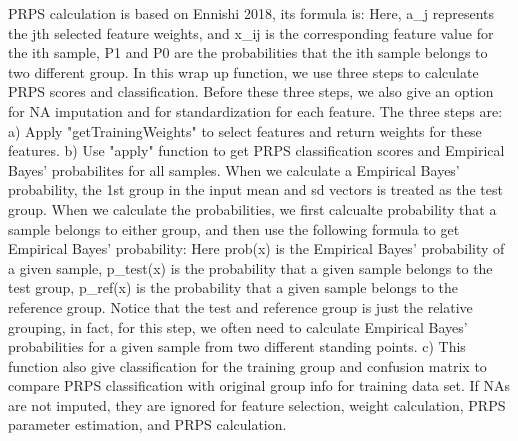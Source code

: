 \documentclass[letterpaper]{book}
\begin{document}
%
\begin{Details}\relax
PRPS calculation is based on Ennishi 2018, its formula is:
Here, a\_j represents the jth selected feature weights, and x\_ij is the corresponding feature value
for the ith sample, 
P1 and P0 are the probabilities that the ith sample belongs to two different group.
In this wrap up function, we use three steps to calculate PRPS scores and classification. 
Before these three steps, we also give an option for NA imputation and for standardization for each feature. 
The three steps are:
a) Apply "getTrainingWeights" to select features and return weights for these features.
b) Use "apply" function to get PRPS classification scores and Empirical Bayes' probabilites for all samples.
When we calculate a Empirical Bayes' probability, the 1st group in the input mean and sd vectors is treated
as the test group. 
When we calculate the probabilities, we first calcualte probability that a sample belongs to either group, 
and then use the 
following formula to get Empirical Bayes' probability:
Here prob(x) is the Empirical Bayes' probability of a given sample, p\_test(x) is the probability
that a given sample belongs to the test group, p\_ref(x) is the probability that a given sample belongs
to the reference group.
Notice that the test and reference group is just the relative grouping, in fact, for this step, 
we often need to calculate Empirical Bayes' probabilities for a given sample from two different standing points.
c) This function also give classification for the training group and confusion matrix to compare PRPS classification
with original group info for training data set.
If NAs are not imputed, they are ignored for feature selection, weight calculation, PRPS parameter estimation, 
and PRPS calculation.
\end{Details}
%
\end{document}

